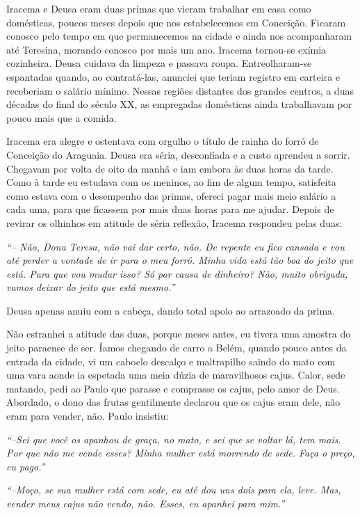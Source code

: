 Iracema e Deusa eram duas primas que vieram trabalhar em casa como domésticas, poucos meses depois que nos estabelecemos em Conceição.
Ficaram conosco pelo tempo em que permanecemos na cidade e ainda nos acompanharam até Teresina, morando conosco por mais um ano.
Iracema tornou-se exímia cozinheira.
Deusa cuidava da limpeza e passava roupa.
Entreolharam-se espantadas quando, ao contratá-las, anunciei que teriam registro em carteira e receberiam o salário mínimo.
Nessas regiões distantes dos grandes centros, a duas décadas do final do século XX, as empregadas domésticas ainda trabalhavam por pouco mais que a comida.

Iracema era alegre e ostentava com orgulho o título de rainha do forró de Conceição do Araguaia.
Deusa era séria, desconfiada e a custo aprendeu a sorrir.
Chegavam por volta de oito da manhã e iam embora às duas horas da tarde.
Como à tarde eu estudava com os meninos, ao fim de algum tempo, satisfeita como estava com o desempenho das primas, ofereci pagar mais meio salário a cada uma, para que ficassem por mais duas horas para me ajudar.
Depois de revirar os olhinhos em atitude de séria reflexão, Iracema respondeu pelas duas:

\textit{``-- Não, Dona Teresa, não vai dar certo, não.
De repente eu fico cansada e vou até perder a vontade de ir para o meu forró.
Minha vida está tão boa do jeito que está.
Para que vou mudar isso? Só por causa de dinheiro? Não, muito obrigada, vamos deixar do jeito que está mesmo.''}

Deusa apenas anuiu com a cabeça, dando total apoio ao arrazoado da prima.

Não estranhei a atitude das duas, porque meses antes, eu tivera uma amostra do jeito paraense de ser.
Íamos chegando de carro a Belém, quando pouco antes da entrada da cidade, vi um caboclo descalço e maltrapilho saindo do mato com uma vara aonde ia espetada uma meia dúzia de maravilhosos cajus.
Calor, sede matando, pedi ao Paulo que parasse e comprasse os cajus, pelo amor de Deus.
Abordado, o dono das frutas gentilmente declarou que os cajus eram dele, não eram para vender, não.
Paulo insistiu: 

\textit{``--Sei que você os apanhou de graça, no mato, e sei que se voltar lá, tem mais.
Por que não me vende esses? Minha mulher está morrendo de sede.
Faça o preço, eu pago.''}

\textit{``--Moço, se sua mulher está com sede, eu até dou uns dois para ela, leve.
Mas, vender meus cajus não vendo, não.
Esses, eu apanhei para mim.''}

